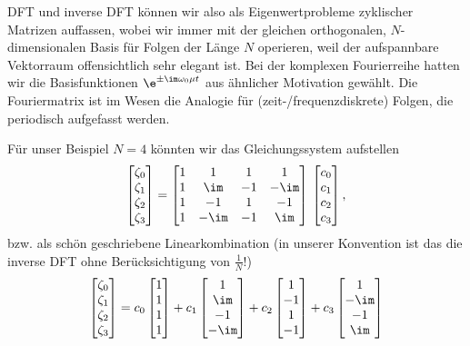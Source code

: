 DFT und inverse DFT können wir also als Eigenwertprobleme
zyklischer Matrizen auffassen, wobei
wir immer mit der gleichen orthogonalen, $N$-dimensionalen Basis
für Folgen der Länge $N$ operieren, weil der aufspannbare Vektorraum
offensichtlich sehr elegant ist. Bei der komplexen Fourierreihe hatten wir die Basisfunktionen $\e^{\pm\im\omega_0 \mu t}$ aus ähnlicher Motivation gewählt.
Die Fouriermatrix ist im Wesen die Analogie für (zeit-/frequenzdiskrete)
Folgen, die periodisch aufgefasst werden.

Für unser Beispiel $N=4$ könnten wir das Gleichungssystem aufstellen
\begin{align}
\begin{bmatrix}
\zeta_0 \\ \zeta_1 \\ \zeta_2 \\ \zeta_3
\end{bmatrix}
=
\begin{bmatrix}
1 & 1 & 1 & 1 \\
1 & \im & -1 & -\im \\
1 & -1 & 1 & -1 \\
1 & -\im & -1 & \im
\end{bmatrix}
\,
\begin{bmatrix}
c_0 \\ c_1 \\ c_2 \\ c_3
\end{bmatrix},
\end{align}
bzw. als schön geschriebene Linearkombination
(in unserer Konvention ist das die inverse DFT ohne Berücksichtigung von $\frac{1}{N}$!)
\begin{align}
\begin{bmatrix}
\zeta_0 \\ \zeta_1 \\ \zeta_2 \\ \zeta_3
\end{bmatrix}
=
c_0
\begin{bmatrix}
1\\1\\1\\1
\end{bmatrix}+
c_1
\begin{bmatrix}
1\\\im\\-1\\-\im
\end{bmatrix}+
c_2
\begin{bmatrix}
1\\-1\\1\\-1
\end{bmatrix}+
c_3
\begin{bmatrix}
1\\-\im\\-1\\\im
\end{bmatrix}
\end{align}

